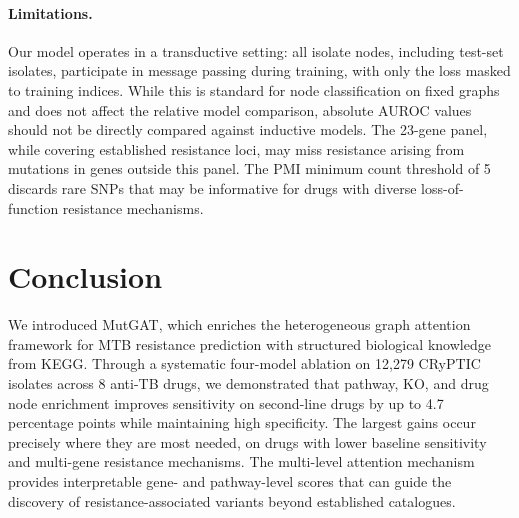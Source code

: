 \documentclass{article}
\theoremstyle{plain}
\theoremstyle{definition}
\theoremstyle{remark}
\begin{document}
\paragraph{Limitations.}
Our model operates in a transductive setting: all isolate nodes, including test-set isolates, participate in message passing during training, with only the loss masked to training indices. While this is standard for node classification on fixed graphs and does not affect the relative model comparison, absolute AUROC values should not be directly compared against inductive models. The 23-gene panel, while covering established resistance loci, may miss resistance arising from mutations in genes outside this panel. The PMI minimum count threshold of 5 discards rare SNPs that may be informative for drugs with diverse loss-of-function resistance mechanisms.


\section{Conclusion}
\label{sec:conclusion}

We introduced MutGAT, which enriches the heterogeneous graph attention framework for MTB resistance prediction with structured biological knowledge from KEGG. Through a systematic four-model ablation on 12{,}279 CRyPTIC isolates across 8 anti-TB drugs, we demonstrated that pathway, KO, and drug node enrichment improves sensitivity on second-line drugs by up to 4.7 percentage points while maintaining high specificity. The largest gains occur precisely where they are most needed, on drugs with lower baseline sensitivity and multi-gene resistance mechanisms. The multi-level attention mechanism provides interpretable gene- and pathway-level scores that can guide the discovery of resistance-associated variants beyond established catalogues.




\end{document}
